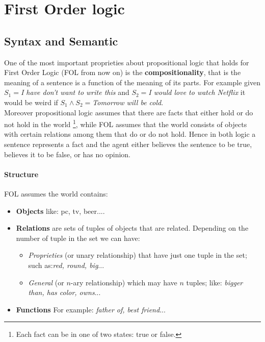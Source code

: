 \documentclass[10pt,a4paper]{article}
\begin{document}
\newpage
\section{First Order logic}

\subsection{Syntax and Semantic}

One of the most important proprieties about propositional logic that holds for First Order Logic (FOL from now on) is the \textbf{compositionality}, that is the meaning of a sentence is a function of the meaning of its parts. For example given $S_1=$\textit{I have don't want to write this} and $S_2=$\textit{I would love to watch Netflix} it would be weird if $S_1 \wedge S_2=$\textit{Tomorrow will be cold}.\\
Moreover propositional logic assumes that there are facts that either hold or do not hold in the world \footnote{Each fact can be in one of two states: true or false.}, while FOL assumes that the world consists of objects with certain relations among them that do or do not hold. Hence in both logic a sentence represents a fact and the agent either believes the sentence to be true, believes it to be false, or has no opinion. 

\paragraph{Structure}
FOL assumes the world contains:
\begin{itemize}
\item \textbf{Objects} like: pc, tv, beer....
\item \textbf{Relations} are sets of tuples of objects that are related. Depending on the number of tuple in the set we can have:
	\begin{itemize}
	\item \textit{Proprieties} (or unary relationship) that have just one tuple in the set; such as:\textit{red, round, big}...
	\item \textit{General} (or $n$-ary relationship)  which may have $n$ tuples; like:\textit{ bigger than, has color, owns}...
	\end{itemize}

\item \textbf{Functions}  For example: \textit{father of, best friend}...
\end{itemize}
\end{document}
